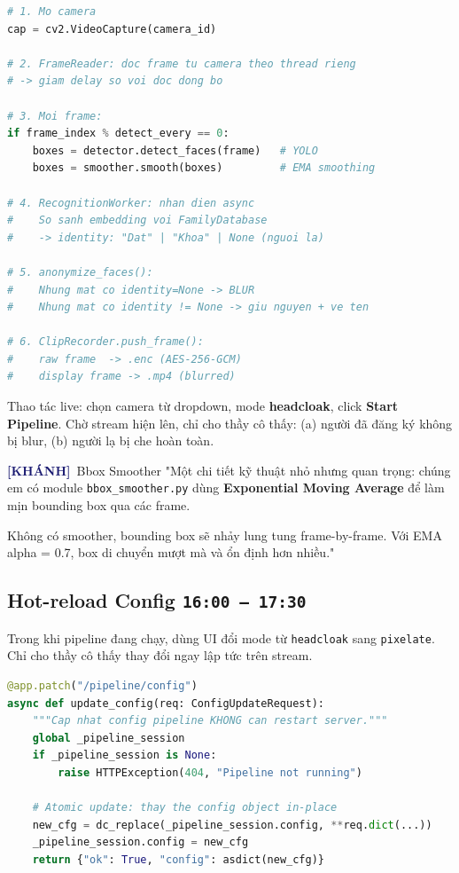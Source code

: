 \documentclass[12pt, a4paper]{article}
\newcommand{\timing}[1]{%
  \hfill\colorbox{NavyBlue!20}{\texttt{\small #1}}%
}
\newcommand{\khanh}{\textcolor{MidnightBlue}{\textbf{[KHÁNH]}}}
\begin{document}
\begin{lstlisting}[language=Python, caption={Pipeline flow (minh họa)}]
# 1. Mo camera
cap = cv2.VideoCapture(camera_id)

# 2. FrameReader: doc frame tu camera theo thread rieng
# -> giam delay so voi doc dong bo

# 3. Moi frame:
if frame_index % detect_every == 0:
    boxes = detector.detect_faces(frame)   # YOLO
    boxes = smoother.smooth(boxes)         # EMA smoothing

# 4. RecognitionWorker: nhan dien async
#    So sanh embedding voi FamilyDatabase
#    -> identity: "Dat" | "Khoa" | None (nguoi la)

# 5. anonymize_faces():
#    Nhung mat co identity=None -> BLUR
#    Nhung mat co identity != None -> giu nguyen + ve ten

# 6. ClipRecorder.push_frame():
#    raw frame  -> .enc (AES-256-GCM)
#    display frame -> .mp4 (blurred)
\end{lstlisting}

\begin{action}
Thao tác live: chọn camera từ dropdown, mode \textbf{headcloak}, click \textbf{Start Pipeline}.
Chờ stream hiện lên, chỉ cho thầy cô thấy:
(a) người đã đăng ký không bị blur, (b) người lạ bị che hoàn toàn.
\end{action}

\begin{dialog}{\khanh\ Bbox Smoother}
"Một chi tiết kỹ thuật nhỏ nhưng quan trọng:
chúng em có module \texttt{bbox\_smoother.py} dùng \textbf{Exponential Moving Average}
để làm mịn bounding box qua các frame.

Không có smoother, bounding box sẽ nhảy lung tung frame-by-frame.
Với EMA alpha = 0.7, box di chuyển mượt mà và ổn định hơn nhiều."
\end{dialog}

\subsection{Hot-reload Config \timing{16:00 – 17:30}}

\begin{action}
Trong khi pipeline đang chạy, dùng UI đổi mode từ \texttt{headcloak} sang \texttt{pixelate}.
Chỉ cho thầy cô thấy thay đổi ngay lập tức trên stream.
\end{action}

\begin{lstlisting}[language=Python, caption={src/app\_api.py --- PATCH /pipeline/config}]
@app.patch("/pipeline/config")
async def update_config(req: ConfigUpdateRequest):
    """Cap nhat config pipeline KHONG can restart server."""
    global _pipeline_session
    if _pipeline_session is None:
        raise HTTPException(404, "Pipeline not running")

    # Atomic update: thay the config object in-place
    new_cfg = dc_replace(_pipeline_session.config, **req.dict(...))
    _pipeline_session.config = new_cfg
    return {"ok": True, "config": asdict(new_cfg)}
\end{lstlisting}
\end{document}
